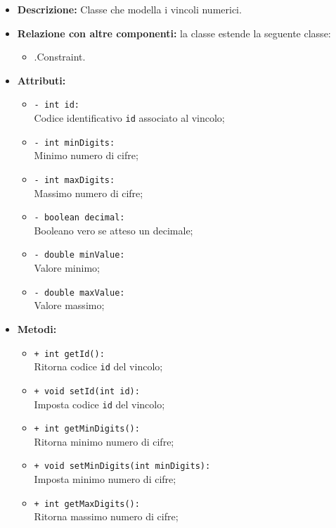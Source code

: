 \begin{flushleft}
\begin{itemize}
\item \textbf{Descrizione:} Classe che modella i vincoli numerici.
\item \textbf{Relazione con altre componenti:} la classe estende la seguente classe:
		\begin{itemize}
			\item \smodel{}.Constraint.
		\end{itemize}
\item \textbf{Attributi:}
\begin{sloppypar}
\begin{itemize}
\item \texttt{- int id:}\\ Codice identificativo \texttt{id} associato al vincolo;
\item \texttt{- int minDigits:}\\ Minimo numero di cifre;
\item \texttt{- int maxDigits:}\\ Massimo numero di cifre;
\item \texttt{- boolean decimal:}\\ Booleano vero se atteso un decimale;
\item \texttt{- double minValue:}\\ Valore minimo;
\item \texttt{- double maxValue:}\\ Valore massimo;
\end{itemize}
\end{sloppypar}
\item \textbf{Metodi:}
\begin{sloppypar}
\begin{itemize}
\item \texttt{+ int getId():}\\ Ritorna codice \texttt{id} del vincolo;
\item \texttt{+ void setId(int id):}\\ Imposta codice \texttt{id} del vincolo;
\item \texttt{+ int getMinDigits():}\\ Ritorna minimo numero di cifre;
\item \texttt{+ void setMinDigits(int minDigits):}\\ Imposta minimo numero di cifre;
\item \texttt{+ int getMaxDigits():}\\ Ritorna massimo numero di cifre;

\end{itemize}
\end{sloppypar}
\end{itemize}
\end{flushleft}
